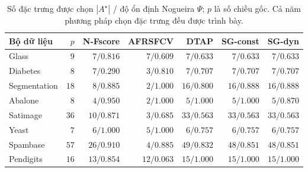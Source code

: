 \begin{table}[htbp]
\centering\small\setlength{\tabcolsep}{4pt}
\caption{Số đặc trưng được chọn $|A^\star|$ / độ ổn định Nogueira $\Psi$; $p$ là số chiều gốc. Cả năm phương pháp chọn đặc trưng đều được trình bày.}\label{tab:nfeat}
\begin{tabular}{lrrrrrr}
\toprule
Bộ dữ liệu & $p$ & N-Fscore & AFRSFCV & DTAP & SG-const & SG-dyn \\
\midrule
Glass & $9$ & $7/0.816$ & $7/0.609$ & $7/0.633$ & $7/0.633$ & $7/0.633$ \\
Diabetes & $8$ & $7/0.290$ & $3/0.810$ & $7/0.707$ & $7/0.707$ & $7/0.707$ \\
Segmentation & $18$ & $8/0.885$ & $2/1.000$ & $16/0.800$ & $16/0.888$ & $16/0.888$ \\
Abalone & $8$ & $4/0.950$ & $2/1.000$ & $5/1.000$ & $5/1.000$ & $5/0.870$ \\
Satimage & $36$ & $10/0.871$ & $3/0.685$ & $33/0.563$ & $33/0.563$ & $33/0.563$ \\
Yeast & $7$ & $6/1.000$ & $5/1.000$ & $6/0.757$ & $6/0.757$ & $6/0.757$ \\
Spambase & $57$ & $26/0.910$ & $4/0.885$ & $49/0.832$ & $48/0.851$ & $48/0.851$ \\
Pendigits & $16$ & $13/0.854$ & $12/0.063$ & $15/1.000$ & $15/1.000$ & $15/1.000$ \\
\bottomrule
\end{tabular}

\end{table}
